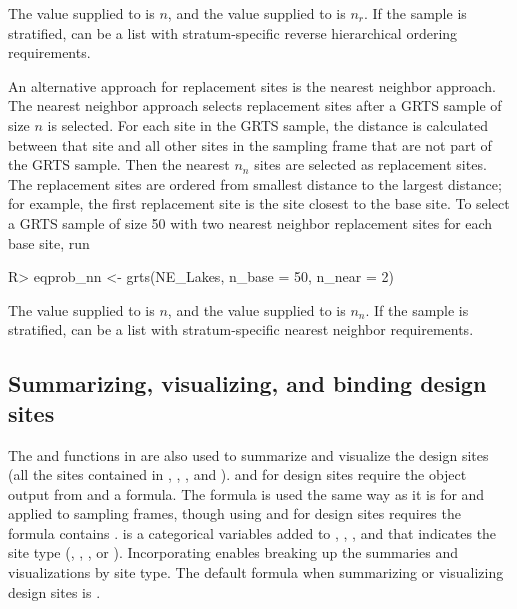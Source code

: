 \documentclass[
  shortnames]{jss}
\begin{document}
The value supplied to  is \(n\), and the value supplied to
 is \(n_r\). If the sample is stratified,  can
be a list with stratum-specific reverse hierarchical ordering
requirements.

An alternative approach for replacement sites is the nearest neighbor
approach. The nearest neighbor approach selects replacement sites after
a GRTS sample of size \(n\) is selected. For each site in the GRTS
sample, the distance is calculated between that site and all other sites
in the sampling frame that are not part of the GRTS sample. Then the
nearest \(n_n\) sites are selected as replacement sites. The replacement
sites are ordered from smallest distance to the largest distance; for
example, the first replacement site is the site closest to the base
site. To select a GRTS sample of size 50 with two nearest neighbor
replacement sites for each base site, run

\begin{CodeChunk}
\begin{CodeInput}
R> eqprob_nn <- grts(NE_Lakes, n_base = 50, n_near = 2)
\end{CodeInput}
\end{CodeChunk}

The value supplied to  is \(n\), and the value supplied to
 is \(n_n\). If the sample is stratified,  can
be a list with stratum-specific nearest neighbor requirements.

\hypertarget{sec:eda_samples}{%
\subsection{Summarizing, visualizing, and binding design
sites}\label{sec:eda_samples}}

The  and  functions in  are
also used to summarize and visualize the design sites (all the sites
contained in , , ,
and ).  and  for design
sites require the object output from  and a formula. The
formula is used the same way as it is for  and
 applied to sampling frames, though using 
and  for design sites requires the formula contains
.  is a categorical variables added to
, , , and
 that indicates the site type (,
, , or ). Incorporating 
enables breaking up the summaries and visualizations by site type. The
default formula when summarizing or visualizing design sites is
.
\end{document}
